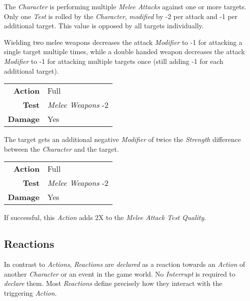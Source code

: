 \hfill

The \emph{Character} is performing multiple \emph{Melee Attacks} against one or
more targets. Only one \emph{Test} is rolled by the \emph{Character},
\emph{modified} by -2 per attack and -1 per additional target.
This value is opposed by all targets individually.

Wielding two melee weapons decreases the attack \emph{Modifier} to -1 for
attacking a single target multiple times, while a double handed weapon decreases
the attack \emph{Modifier} to -1 for attacking multiple targets once (still
adding  -1 for each additional target).


\begin{tabular}{rl}
    \textbf{Action} & Full                    \\
    \textbf{Test}   & \emph{Melee Weapons} -2 \\
    \textbf{Damage} & Yes                     \\
\end{tabular}

\hfill

The target gets an additional negative \emph{Modifier} of twice the
\emph{Strength} difference between the \emph{Character} and the target.


\begin{tabular}{rl}
    \textbf{Action} & Full                    \\
    \textbf{Test}   & \emph{Melee Weapons} -2 \\
    \textbf{Damage} & Yes                     \\
\end{tabular}

\hfill

If successful, this \emph{Action} adds 2X to the \emph{Melee Attack Test Quality}.

\subsection{Reactions}

In contrast to \emph{Actions}, \emph{Reactions} are \emph{declared} as a reaction
towards an \emph{Action} of another \emph{Character} or an event in the game world.
No \emph{Interrupt} is required to \emph{declare} them. Most \emph{Reactions} define
precisely how they interact with the triggering \emph{Action}.

